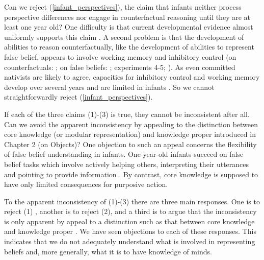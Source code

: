 \documentclass[12pt,\papersize]{extarticle}
\begin{document}
Can we reject (\ref{infant_perspectives}), the claim that infants neither process perspective differences nor engage in counterfactual reasoning until they are at least one year old?
One difficulty is that current developmental evidence almost uniformly supports this claim  \citep{rafetseder:2010_counterfactual,beck:2011_almost}.
A second problem is that the development of abilities to reason counterfactually,
like the development of abilities to represent false belief,
appears to involve working memory and inhibitory control 
(on counterfactuals: 
	\citealp{drayton:2011_counterfactual,beck:2011_supporting};
on false beliefs: \citealp{apperly:2008_back, Apperly:2009cc}; \citealp{lin:2010_reflexively, McKinnon:2007rr} experiments 4-5; \citealp{saxe_reading_2006}).
As even committed nativists are likely to agree, capacities for inhibitory control and working memory develop over several years and are limited in infants \citep[e.g.][]{carlson:2005_developmentally}.
So we cannot straightforwardly reject (\ref{infant_perspectives}).



If each of the three claims (1)-(3) is true, they cannot be inconsistent after all. 
Can we avoid the apparent inconsistency by appealing to the distinction between core knowledge (or modular representation) and knowledge proper introduced in Chapter 2 (on Objects)?  
One objection to such an appeal concerns the flexibility of false belief understanding in infants.
One-year-old infants succeed on false belief tasks which involve actively helping others, interpreting their utterances and pointing to provide information \citep{Buttelmann:2009gy,Knudsen:2011fk,southgate:2010fb}. 
By contrast, core knowledge is supposed to have only limited consequences for purposive action.

To the apparent inconsistency of (1)-(3) there are three main responses.
One is to reject (1) \citep[e.g.][]{Perner:2005hq}, 
another is to reject (2),
 and a third is to argue that the inconsistency is only apparent by appeal to a distinction such as that between core knowledge and knowledge proper \citep[e.g.][]{Clements:1994cw,low:2010_preschoolers}.
We have seen objections to each of these responses.
This indicates that we do not adequately understand what is involved in representing beliefs and, more generally, what it is to have %
knowledge of minds.
\end{document}
